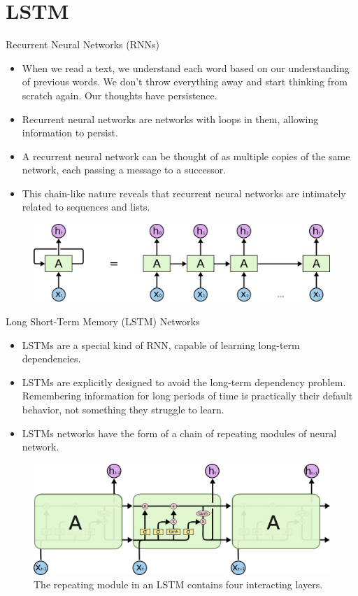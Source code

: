 \documentclass{beamer}
\begin{document}
\section{LSTM}
\begin{frame}{Recurrent Neural Networks (RNNs)}
	\begin{itemize}
		\item When we read a text, we understand each word based on our understanding of previous words. We don't throw everything away and start thinking from scratch again. Our thoughts have persistence.
		\item Recurrent neural networks are networks with loops in them, allowing information to persist.
		\item A recurrent neural network can be thought of as multiple copies of the same network, each passing a message to a successor. 
		\item This chain-like nature reveals that recurrent neural networks are intimately related to sequences and lists.
	\end{itemize}
	\begin{figure}[htbp]
		\includegraphics[scale=0.30]{images/RNN-unrolled}
	\end{figure}
\end{frame}
\begin{frame}{Long Short-Term Memory (LSTM) Networks}
	\begin{itemize}
		\item LSTMs are a special kind of RNN, capable of learning long-term dependencies.
		\item LSTMs are explicitly designed to avoid the long-term dependency problem. Remembering information for long periods of time is practically their default behavior, not something they struggle to learn.
		\item LSTMs networks have the form of a chain of repeating modules of neural network.
	\end{itemize}
	\begin{figure}[htbp]
		\includegraphics[scale=0.3]{images/LSTM3-chain}
		\caption*{The repeating module in an LSTM contains four interacting layers.}
	\end{figure}
\end{frame}
\end{document}
